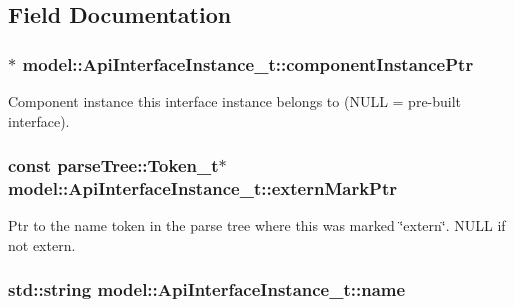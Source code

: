 \subsection{Field Documentation}
\subsubsection[{\texorpdfstring{component\+Instance\+Ptr}{componentInstancePtr}}]{$\ast$ model\+::\+Api\+Interface\+Instance\+\_\+t\+::component\+Instance\+Ptr}\hypertarget{structmodel_1_1_api_interface_instance__t_a4c37d0ba0da80e384c087035aedba709}{}\label{structmodel_1_1_api_interface_instance__t_a4c37d0ba0da80e384c087035aedba709}


Component instance this interface instance belongs to (N\+U\+LL = pre-\/built interface). 

\subsubsection[{\texorpdfstring{extern\+Mark\+Ptr}{externMarkPtr}}]{\setlength{\rightskip}{0pt plus 5cm}const {\bf parse\+Tree\+::\+Token\+\_\+t}$\ast$ model\+::\+Api\+Interface\+Instance\+\_\+t\+::extern\+Mark\+Ptr}\hypertarget{structmodel_1_1_api_interface_instance__t_ac7ee7a5b626887e5738b861a98850064}{}\label{structmodel_1_1_api_interface_instance__t_ac7ee7a5b626887e5738b861a98850064}
Ptr to the name token in the parse tree where this was marked \char`\"{}extern\char`\"{}. N\+U\+LL if not extern. 
\subsubsection[{\texorpdfstring{name}{name}}]{\setlength{\rightskip}{0pt plus 5cm}std\+::string model\+::\+Api\+Interface\+Instance\+\_\+t\+::name}\hypertarget{structmodel_1_1_api_interface_instance__t_a026897fdfeabd20dd30bf19ba12a5e8b}{}\label{structmodel_1_1_api_interface_instance__t_a026897fdfeabd20dd30bf19ba12a5e8b}


